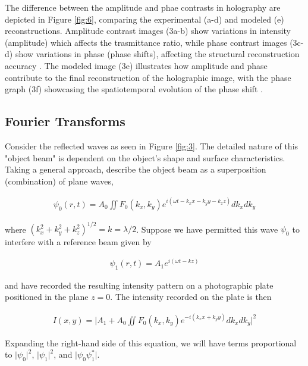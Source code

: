 \documentclass[12pt]{article}
\begin{document}
The difference between the amplitude and phae contrasts in holography are depicted in Figure \ref{fig:6}, comparing the experimental (a-d) and modeled (e) reconstructions.
Amplitude contrast images (3a-b) show variations in intensity (amplitude) which affects the trasmittance ratio, while phase contrast images (3c-d) show variations in phase (phase shifts), affecting the structural reconstruction accuracy \cite{latychevskaia2009simultaneous,ampvphaseimg}.
The modeled image (3e) illustrates how amplitude and phase contribute to the final reconstruction of the holographic image, with the phase graph (3f) showcasing the spatiotemporal evolution of the phase shift \cite{ampvphaseimg}.

\subsection{Fourier Transforms} \label{sec:1.3}

Consider the reflected waves as seen in Figure \ref{fig:3}. The detailed nature of this "object beam" is dependent on the object's shape and surface
characteristics. Taking a general approach, describe the object beam as a superposition (combination) of plane waves,

\vspace{-2ex}
\begin{gather*}
    \psi_0 (r,t) = A_0 \iint F_0 (k_x,k_y) e^{i(\omega t- k_x x- k_y y - k_z z)} dk_x dk_y 
\end{gather*}

where $(k_x^2 + k_y^2 + k_z^2)^{1/2} = k = \lambda / 2$. Suppose we have permitted this wave $\psi_0$ to interfere with a reference beam given by

\vspace{-2ex}
\begin{gather*}
    \psi_1 (r,t) = A_1 e^{i(\omega t - kz)}
\end{gather*}

and have recorded the resulting intensity pattern on a photographic plate positioned in the plane $z = 0$. The intensity recorded on the plate is then

\vspace{-2ex}
\begin{gather*}
    I(x,y) = \lvert A_1 + A_0 \iint F_0 (k_x,k_y) e^{-i(k_x x + k_y y)} dk_x dk_y \rvert^2
\end{gather*}

Expanding the right-hand side of this equation, we will have terms proportional to $\lvert \psi_0 \rvert^2$, $\lvert \psi_1 \rvert^2$, and $\lvert \psi_0 \psi_1^* \rvert$.
\end{document}

